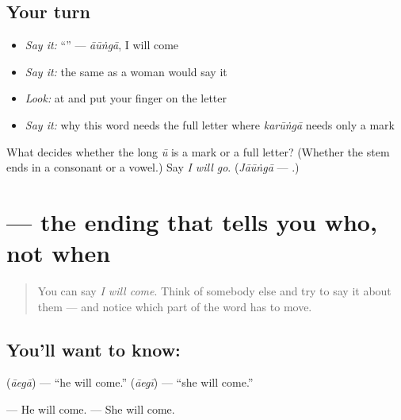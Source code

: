 \subsection*{Your turn}
\begin{itemize}
\raggedright
  \item \emph{Say it:} \textquotedblleft{}\textquotedblright{} — \emph{āūṅgā}, I will come
  \item \emph{Say it:} the same as a woman would say it
  \item \emph{Look:} at  and put your finger on the letter \textbf{}
  \item \emph{Say it:} why this word needs the full letter where \emph{karūṅgā} needs only a mark
\end{itemize}

\begin{tcolorbox}[breakable,colback=teal!4,colframe=teal!35!black,title={Before you move on}]
What decides whether the long \emph{ū} is a mark or a full letter? (Whether the stem ends in a consonant or a vowel.) Say \emph{I will go}. (\emph{Jāūṅgā} — \textbf{}.)
\end{tcolorbox}
\section[\texorpdfstring{\hi{आएगा} (āegā)}{आएगा (āegā)}]{ — the ending that tells you who, not when}

\label{lesson:HI-C88-aaega}



\begin{quote}
You can say \emph{I will come}. Think of somebody else and try to say it about them — and notice which part of the word has to move.
\end{quote}

\subsection*{You'll want to know: }
\textbf{} (\emph{āegā}) — \textquotedblleft{}he will come.\textquotedblright{} \textbf{} (\emph{āegī}) — \textquotedblleft{}she will come.\textquotedblright{}

\textbf{ } — He will come. \textbf{ } — She will come.

